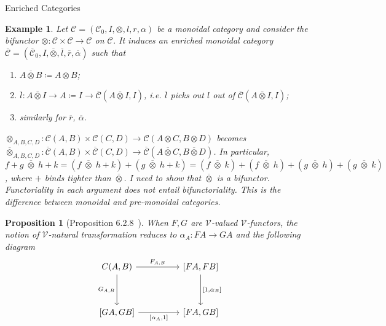 \documentclass[acmsmall, screen, nonacm]{acmart}
\newtheorem{example}[theorem]{Example}
\newtheorem{proposition}[theorem]{Proposition}
\newcommand\question[1]{{\color{azure}#1}}
\newcommand\enriched[1]{{\overline{\mathcal{#1}}}}
\begin{document}
\begin{section}{Enriched Categories}
\begin{example}
  Let $\mathcal{C} = (\mathcal{C}_{0},I,\otimes, l, r, \alpha)$ be a monoidal category and consider the bifunctor $\otimes : \mathcal{C} \times \mathcal{C} \to \mathcal{C}$ on $\mathcal{C}$.
  It induces an enriched monoidal category $\enriched{C} = (\enriched{C}_{0}, I, \enriched{\otimes}, \overline{l}, \overline{r}, \enriched{\alpha})$ such that
  \begin{enumerate}
    \item $A \overline{\otimes} B \coloneq A \otimes B$;
    \item $\overline{l} : A \overline{\otimes} I \to A \coloneq I \to \enriched{C}(A \overline{\otimes} I, I)$, i.e. $\overline{l}$ picks out $l$ out of $\enriched{C}(A \overline{\otimes} I, I)$;
    \item similarly for $\overline{r}$, $\overline{\alpha}$.
  \end{enumerate}
  $\otimes_{A,B,C,D} : \mathcal{C}(A,B) \times \mathcal{C}(C,D) \to \mathcal{C}(A \otimes C, B \otimes D)$ becomes $\overline{\otimes}_{A,B,C,D} : \enriched{C}(A,B) \times \enriched{C}(C,D) \to \enriched{C}(A \overline{\otimes} C, B \overline{\otimes} D)$.
  In particular, $f + g \;\overline{\otimes}\; h + k = (f \;\overline{\otimes}\; h + k) + (g \;\overline{\otimes}\; h + k) = (f \;\overline{\otimes}\; k) + (f \;\overline{\otimes}\; h) + (g \;\overline{\otimes}\; h) + (g \;\overline{\otimes}\; k)$, where $+$ binds tighter than $\overline{\otimes}$.
  \question{I need to show that $\overline{\otimes}$ is a bifunctor. Functoriality in each argument does not entail bifunctoriality. This is the difference between monoidal and pre-monoidal categories.
  }
\end{example}

\begin{proposition}[Proposition 6.2.8~\cite{Borceux_1994}]
  When $F,G$ are $\mathcal{V}$-valued $\mathcal{V}$-functors, the notion of $\mathcal{V}$-natural transformation reduces to
  $\alpha_{A} : FA \to GA$ and the following diagram
  \[\begin{tikzcd}
	{C(A,B)} && {[FA,FB]} \\
	\\
	{[GA,GB]} && {[FA,GB]}
	\arrow["{F_{A,B}}", from=1-1, to=1-3]
	\arrow["{G_{A,B}}"', from=1-1, to=3-1]
	\arrow["{[1,\alpha_{B}]}", from=1-3, to=3-3]
	\arrow["{[\alpha_{A},1]}"', from=3-1, to=3-3]
\end{tikzcd}\]
\end{proposition}


\end{section}
\end{document}
